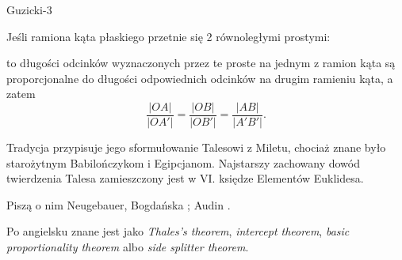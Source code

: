 %

Guzicki-3

\begin{theorem}[Talesa]
    Jeśli ramiona kąta płaskiego przetnie się 2 równoległymi prostymi:
    \begin{center}
\begin{comment}
        \begin{tikzpicture}
            \tkzDefPoint(0, 0.5){O}
            \tkzDefPoint(1.5, 0){A}
            \tkzDefPoint(2, 1){Ap}
            \tkzDefPointBy[homothety=center O ratio 1.618](A) \tkzGetPoint{B}
            \tkzDefLine[parallel=through B](A,Ap) \tkzGetPoint{Bp}
            \tkzInterLL(O,Ap)(B,Bp) \tkzGetPoint{Bpp}
            \tkzDrawPoints[fill=gray,opacity=.9](O,A,B,Ap,Bpp)
            \tkzLabelPoint[above](O){$O$}
            \tkzLabelPoint[below](A){$A$}
            \tkzLabelPoint[below](B){$A'$}
            \tkzLabelPoint[above left](Bpp){$B'$}
            \tkzLabelPoint[above left](Ap){$B$}
            \tkzDrawLine[thick](O,B)
            \tkzDrawLine[thick](O,Bpp)
            \tkzDrawLine[color=blue, thick](A,Ap)
            \tkzDrawLine[color=blue, thick](B,Bpp)
        \end{tikzpicture}
\end{comment}
        \end{center}
    to długości odcinków wyznaczonych przez te proste na jednym z ramion kąta są proporcjonalne do długości odpowiednich odcinków na drugim ramieniu kąta, a zatem
    \begin{equation}
        \label{thales_ratio}
        \frac{|OA|}{|OA'|} = \frac{|OB|}{|OB'|} = \frac{|AB|}{|A'B'|}.
    \end{equation}
\end{theorem}

Tradycja przypisuje jego sformułowanie Talesowi z Miletu, chociaż znane było starożytnym Babilończykom i Egipcjanom.
%
Najstarszy zachowany dowód twierdzenia Talesa zamieszczony jest w VI. księdze Elementów Euklidesa. 

Piszą o nim Neugebauer, Bogdańska \cite[s. 48-56]{neugebauer_2018}; Audin \cite[s. 24, 173]{audin_2003}.

Po angielsku znane jest jako \emph{Thales's theorem}, \emph{intercept theorem}, \emph{basic proportionality theorem} albo \emph{side splitter theorem}.

